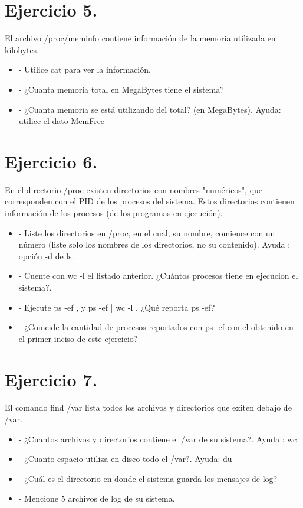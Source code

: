 \documentclass[12pt]{article}
\begin{document}
\section{Ejercicio 5.}
El archivo /proc/meminfo contiene información de la memoria utilizada en kilobytes.

\begin{itemize}
\item - Utilice cat para ver la información.
\item - ¿Cuanta memoria total en MegaBytes tiene el sistema?
\item - ¿Cuanta memoria se está utilizando del total? (en MegaBytes). Ayuda: utilice el dato MemFree
\end{itemize}


\section{Ejercicio 6.}
En el directorio /proc existen directorios con nombres "numéricos", que corresponden con el PID de los procesos del sistema.
Estos directorios contienen información de los procesos (de los programas en ejecución).
\begin{itemize}
\item - Liste los directorios en /proc, en el cual, su nombre, comience con un número (liste solo los nombres de los directorios, no su contenido). Ayuda : opción -d de ls.
\item - Cuente con wc -l el listado anterior. ¿Cuántos procesos tiene en ejecucion el sistema?.
\item - Ejecute ps -ef , y ps -ef | wc -l . ¿Qué reporta ps -ef?
\item - ¿Coincide la cantidad de procesos reportados con ps -ef con el obtenido en el primer inciso de este ejercicio?
\end{itemize}


\section{Ejercicio 7.}
El comando find /var lista todos los archivos y directorios que exiten debajo de /var.
\begin{itemize}
\item - ¿Cuantos archivos y directorios contiene el /var de su sistema?. Ayuda : wc
\item - ¿Cuanto espacio utiliza en disco todo el /var?. Ayuda: du
\item - ¿Cuál es el directorio en donde el sistema guarda los mensajes de log?
\item - Mencione 5 archivos de log de su sistema.
\end{itemize}
\end{document}
